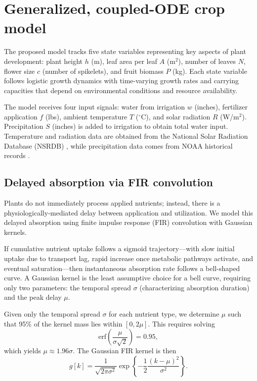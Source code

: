 \documentclass[preprint,12pt]{elsarticle}
\newcommand{\df}[2]{\displaystyle\frac{#1}{#2}}
\begin{document}
\section{Generalized, coupled-ODE crop model}\label{sec:modeling}

The proposed model tracks five state variables representing key aspects of plant development: plant height $h$ (m), leaf area per leaf $A$ (m$^{2}$), number of leaves $N$, flower size $c$ (number of spikelets), and fruit biomass $P$ (kg). Each state variable follows logistic growth dynamics with time-varying growth rates and carrying capacities that depend on environmental conditions and resource availability.

The model receives four input signals: water from irrigation $w$ (inches), fertilizer application $f$ (lbs), ambient temperature $T$ ($^{\circ}$C), and solar radiation $R$ (W/m$^{2}$). Precipitation $S$ (inches) is added to irrigation to obtain total water input. Temperature and radiation data are obtained from the National Solar Radiation Database (NSRDB) \cite{nsrdb}, while precipitation data comes from NOAA historical records \cite{noaa-precip}.

\subsection{Delayed absorption via FIR convolution}\label{subsec:fir-conv}

Plants do not immediately process applied nutrients; instead, there is a physiologically-mediated delay between application and utilization. We model this delayed absorption using finite impulse response (FIR) convolution with Gaussian kernels.

If cumulative nutrient uptake follows a sigmoid trajectory---with slow initial uptake due to transport lag, rapid increase once metabolic pathways activate, and eventual saturation---then instantaneous absorption rate follows a bell-shaped curve. A Gaussian kernel is the least assumptive choice for a bell curve, requiring only two parameters: the temporal spread $\sigma$ (characterizing absorption duration) and the peak delay $\mu$.

Given only the temporal spread $\sigma$ for each nutrient type, we determine $\mu$ such that 95\% of the kernel mass lies within $[0, 2\mu]$. This requires solving
\begin{equation}
\text{erf}\left(\df{\mu}{\sigma\sqrt{2}}\right) = 0.95,
\label{eqn:erf}
\end{equation}
which yields $\mu \approx 1.96\sigma$. The Gaussian FIR kernel is then
\begin{equation}
g[k] = \df{1}{\sqrt{2\pi\sigma^{2}}} \exp\left\{ -\df{1}{2}\df{(k-\mu)^{2}}{\sigma^{2}} \right\}.
\label{eqn:gaussian-kernel}
\end{equation}
\end{document}
